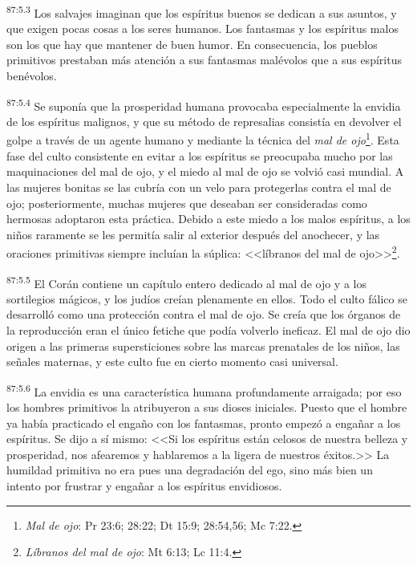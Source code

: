 \par
\textsuperscript{87:5.3} Los salvajes imaginan que los espíritus buenos se dedican a sus asuntos, y que exigen pocas cosas a los seres humanos. Los fantasmas y los espíritus malos son los que hay que mantener de buen humor. En consecuencia, los pueblos primitivos prestaban más atención a sus fantasmas malévolos que a sus espíritus benévolos.

\par
\textsuperscript{87:5.4} Se suponía que la prosperidad humana provocaba especialmente la envidia de los espíritus malignos, y que su método de represalias consistía en devolver el golpe a través de un agente humano y mediante la técnica del \textit{mal de ojo}\footnote{\textit{Mal de ojo}: Pr 23:6; 28:22; Dt 15:9; 28:54,56; Mc 7:22.}. Esta fase del culto consistente en evitar a los espíritus se preocupaba mucho por las maquinaciones del mal de ojo, y el miedo al mal de ojo se volvió casi mundial. A las mujeres bonitas se las cubría con un velo para protegerlas contra el mal de ojo; posteriormente, muchas mujeres que deseaban ser consideradas como hermosas adoptaron esta práctica. Debido a este miedo a los malos espíritus, a los niños raramente se les permitía salir al exterior después del anochecer, y las oraciones primitivas siempre incluían la súplica: <<líbranos del mal de ojo>>\footnote{\textit{Líbranos del mal de ojo}: Mt 6:13; Lc 11:4.}.

\par
\textsuperscript{87:5.5} El Corán contiene un capítulo entero dedicado al mal de ojo y a los sortilegios mágicos, y los judíos creían plenamente en ellos. Todo el culto fálico se desarrolló como una protección contra el mal de ojo. Se creía que los órganos de la reproducción eran el único fetiche que podía volverlo ineficaz. El mal de ojo dio origen a las primeras supersticiones sobre las marcas prenatales de los niños, las señales maternas, y este culto fue en cierto momento casi universal.

\par
\textsuperscript{87:5.6} La envidia es una característica humana profundamente arraigada; por eso los hombres primitivos la atribuyeron a sus dioses iniciales. Puesto que el hombre ya había practicado el engaño con los fantasmas, pronto empezó a engañar a los espíritus. Se dijo a sí mismo: <<Si los espíritus están celosos de nuestra belleza y prosperidad, nos afearemos y hablaremos a la ligera de nuestros éxitos.>> La humildad primitiva no era pues una degradación del ego, sino más bien un intento por frustrar y engañar a los espíritus envidiosos.

